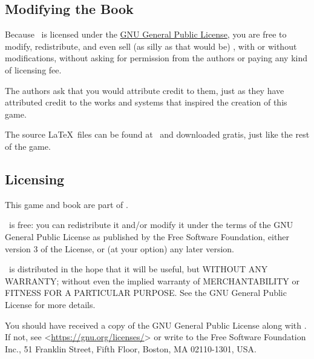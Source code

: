 \subsection{Modifying the Book}

\par
Because \getTitle\, is licensed under the \hyperlink{Licensing}{GNU General Public License}, you are free to modify, redistribute, and even sell (as silly as that would be) \getTitle , with or without modifications, without asking for permission from the authors or paying any kind of licensing fee.

\par
The authors ask that you would attribute credit to them, just as they have attributed credit to the works and systems that inspired the creation of this game.

\par
The source \LaTeX\, files can be found at \website\, and downloaded gratis, just like the rest of the game.

\subsection{Licensing}
\par
\hypertarget{Licensing}{This game and book are part of \getTitle .}

\par
\getTitle\, is free: you can redistribute it and/or modify it under the terms of the GNU General Public License as published by the Free Software Foundation, either version 3 of the License, or (at your option) any later version.

\par
\getTitle\, is distributed in the hope that it will be useful, but WITHOUT ANY WARRANTY; without even the implied warranty of MERCHANTABILITY or FITNESS FOR A PARTICULAR PURPOSE. See the GNU General Public License for more details.

You should have received a copy of the GNU General Public License along with \getTitle . If not, see <\href{https://gnu.org/licenses/}{https://gnu.org/licenses/}> or write to the Free Software Foundation Inc., 51 Franklin Street, Fifth Floor, Boston, MA 02110-1301, USA.
